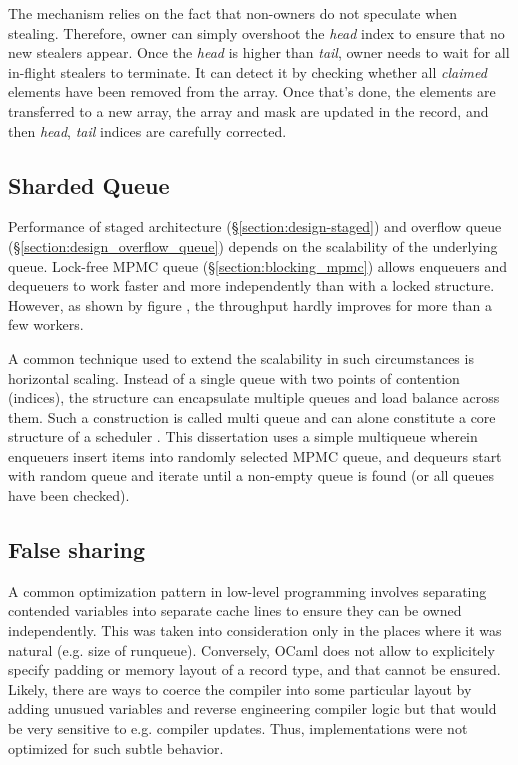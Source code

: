 \documentclass[12pt,a4paper,twoside]{report}
\begin{document}
The mechanism relies on the fact that non-owners do not speculate when stealing. Therefore, owner can simply overshoot the \textit{head} index to ensure that no new stealers appear. Once the \textit{head} is higher than \textit{tail}, owner needs to wait for all in-flight stealers to terminate. It can detect it by checking whether all \textit{claimed} elements have been removed from the array. Once that's done, the elements are transferred to a new array, the array and mask are updated in the record, and then \textit{head}, \textit{tail} indices are carefully corrected.

\subsection{Sharded Queue}

Performance of staged architecture (\S\ref{section:design-staged}) and overflow queue (\S\ref{section:design_overflow_queue}) depends on the scalability of the underlying queue. Lock-free MPMC queue (\S\ref{section:blocking_mpmc}) allows enqueuers and dequeuers to work faster and more independently than with a locked structure. However, as shown by figure , the throughput hardly improves for more than a few workers.  

A common technique used to extend the scalability in such circumstances is horizontal scaling. Instead of a single queue with two points of contention (indices), the structure can encapsulate multiple queues and load balance across them. Such a construction is called multi queue and can alone constitute a core structure of a scheduler \cite{Postnikova2022}. This dissertation uses a simple multiqueue wherein enqueuers insert items into randomly selected MPMC queue, and dequeurs start with random queue and iterate until a non-empty queue is found (or all queues have been checked).

\subsection{False sharing}
A common optimization pattern in low-level programming involves separating contended variables into separate cache lines to ensure they can be owned independently. This was taken into consideration only in the places where it was natural (e.g. size of runqueue). Conversely, OCaml does not allow to explicitely specify padding or memory layout of a record type, and that cannot be ensured. Likely, there are ways to coerce the compiler into some particular layout by adding unusued variables and reverse engineering compiler logic but that would be very sensitive to e.g. compiler updates. Thus, implementations were not optimized for such subtle behavior. 
\end{document}
